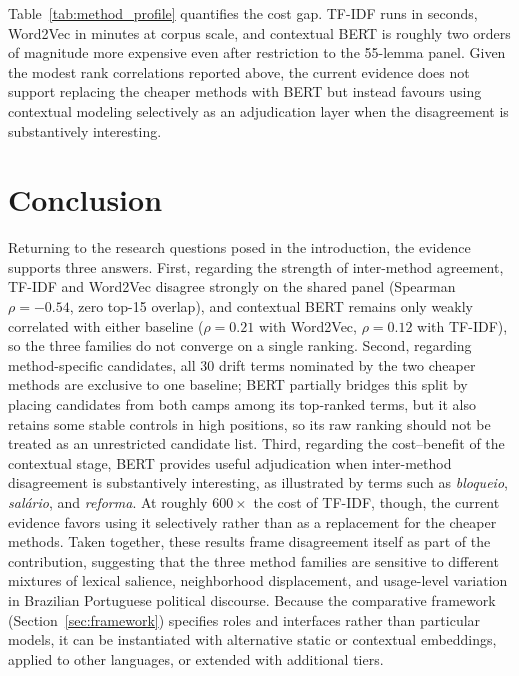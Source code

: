 \documentclass[12pt]{article}
\begin{document}
Table~\ref{tab:method_profile} quantifies the cost gap. TF-IDF runs in
seconds, Word2Vec in minutes at corpus scale, and contextual BERT is roughly
two orders of magnitude more expensive even after restriction to the 55-lemma
panel. Given the modest rank
correlations reported above, the current evidence does not support replacing the
cheaper methods with BERT but instead favours using contextual modeling
selectively as an adjudication layer when the disagreement is substantively
interesting.

\FloatBarrier

\section{Conclusion}
\label{sec:conclusion}

Returning to the research questions posed in the introduction, the evidence
supports three answers. First, regarding the strength of inter-method
agreement, TF-IDF and Word2Vec disagree strongly on the shared panel (Spearman
$\rho = -0.54$, zero top-15 overlap), and contextual BERT remains only weakly
correlated with either baseline ($\rho = 0.21$ with Word2Vec, $\rho = 0.12$
with TF-IDF), so the three families do not converge on a single ranking.
Second, regarding method-specific candidates, all 30 drift terms nominated by
the two cheaper methods are exclusive to one baseline; BERT partially bridges
this split by placing candidates from both camps among its top-ranked terms,
but it also retains some stable controls in high positions, so its raw ranking
should not be treated as an unrestricted candidate list. Third, regarding the
cost--benefit of the contextual stage, BERT provides useful adjudication when
inter-method disagreement is substantively interesting, as illustrated by
terms such as \textit{bloqueio}, \textit{sal\'ario}, and \textit{reforma}.
At roughly $600{\times}$ the cost of TF-IDF, though, the current evidence
favors using it selectively rather than as a replacement for the cheaper
methods. Taken
together, these results frame disagreement itself as part of the
contribution, suggesting that the three method families are sensitive to
different mixtures of lexical
salience, neighborhood displacement, and usage-level variation in Brazilian
Portuguese political discourse. Because the comparative framework
(Section~\ref{sec:framework}) specifies roles and interfaces rather than
particular models, it can be instantiated with alternative static or
contextual embeddings, applied to other languages, or extended with
additional tiers.
\end{document}
